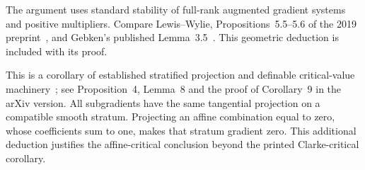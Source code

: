 The argument uses standard stability of full-rank augmented gradient systems and positive multipliers. Compare Lewis--Wylie, Propositions~5.5--5.6 of the 2019 preprint~\cite{LW}, and Gebken's published Lemma~3.5~\cite{BG}. This geometric deduction is included with its proof.

This is a corollary of established stratified projection and definable critical-value machinery~\cite{BDLS}; see Proposition~4, Lemma~8 and the proof of Corollary~9 in the arXiv version. All subgradients have the same tangential projection on a compatible smooth stratum. Projecting an affine combination equal to zero, whose coefficients sum to one, makes that stratum gradient zero. This additional deduction justifies the affine-critical conclusion beyond the printed Clarke-critical corollary.
